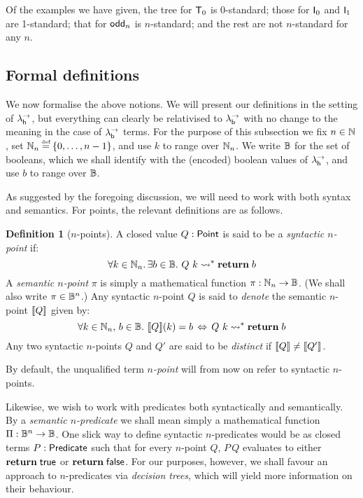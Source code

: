 \documentclass[12pt,phd,lfcs,twoside,openright,logo,leftchapter,normalheadings]{infthesis}
\theoremstyle{plain}
\theoremstyle{definition}
\newtheorem{definition}[theorem]{Definition}
\begin{document}
Of the examples we have given, the tree for $\mathsf{T}_0$ is 0-standard;
those for $\mathsf{I}_0$ and $\mathsf{I}_1$ are 1-standard; that for
$\mathsf{odd}_n$ is $n$-standard; and the rest are not $n$-standard for
any $n$.

\subsection{Formal definitions}
\label{sec:predicate-models}
We now formalise the above notions.  We will present our definitions
in the setting of $\lambda^\rightarrow_{\mathsf{h}}$, but everything can clearly be relativised
to $\lambda^\rightarrow_{\mathsf{b}}$ with no change to the meaning in the case of $\lambda^\rightarrow_{\mathsf{b}}$
terms.  For the purpose of this subsection we fix $n \in \mathbb{N}$, set
$\N_n \defas \{0,\ldots,n-1\}$, and use $k$ to range over $\mathbb{N}_n$. We
write $\mathbb{B}$ for the set of booleans, which we shall identify with the
(encoded) boolean values of $\lambda^\rightarrow_{\mathsf{h}}$, and use $b$ to range over $\mathbb{B}$.

As suggested by the foregoing discussion, we will need to work with
both syntax and semantics.  For points, the relevant definitions are
as follows.

\begin{definition}[$n$-points]\label{def:semantic-n-point}
  A closed value $Q : \mathsf{Point}$ is said to be a \emph{syntactic $n$-point} if:
{
  \[
    \forall k \in \mathbb{N}_n.\,\exists b \in \mathbb{B}.~ Q~k \leadsto^\ast \mathbf{return}\;b
  \]}%
A \emph{semantic $n$-point} $\pi$ is simply a mathematical function
$\pi: \mathbb{N}_n \to \mathbb{B}$.  (We shall also write $\pi \in \mathbb{B}^n$.)  Any
syntactic $n$-point $Q$ is said to \emph{denote} the semantic
$n$-point $\val{Q}$ given by:
{
  \[
  \forall k \in \mathbb{N}_n,\, b \in \mathbb{B}.~ \llbracket Q \rrbracket (k) = b \,\Leftrightarrow\, Q~k \leadsto^\ast \mathbf{return}\;b
  \]}%
%
Any two syntactic $n$-points $Q$ and $Q'$ are said to be
\emph{distinct} if $\val{Q} \neq \val{Q'}$.
%
\end{definition}

By default, the unqualified term \emph{$n$-point} will from now on
refer to syntactic $n$-points.

Likewise, we wish to work with predicates both syntactically and
semantically.  By a \emph{semantic $n$-predicate} we shall mean simply
a mathematical function $\Pi: \mathbb{B}^n \to \mathbb{B}$.  One slick way to define
syntactic $n$-predicates would be as closed terms $P:\mathsf{Predicate}$ such
that for every $n$-point $Q$, $P\,Q$ evaluates to either
$\mathbf{return}\;\mathsf{true}$ or $\mathbf{return}\;\mathsf{false}$.  For our purposes, however, we
shall favour an approach to $n$-predicates via \emph{decision trees},
which will yield more information on their behaviour.
\end{document}
